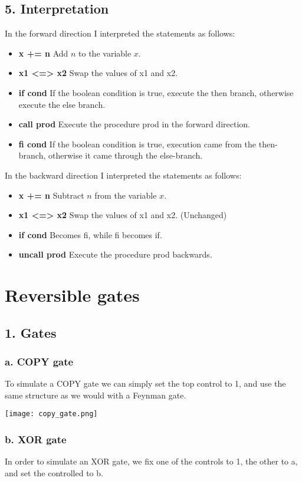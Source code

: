 \documentclass[12pt]{report}
\begin{document}
\subsection*{5. Interpretation}
In the forward direction I interpreted the statements as follows:
\begin{itemize}
\item \textbf{ x += n } Add $n$ to the variable $x$.
\item \textbf{ x1 <=> x2 } Swap the values of x1 and x2.
\item \textbf{ if cond } If the boolean condition is true, execute the then branch, otherwise execute the else branch.
\item \textbf{ call prod } Execute the procedure prod in the forward direction.

\item \textbf{ fi cond } If the boolean condition is true, execution came from the then-branch, otherwise it came through the else-branch.
\end{itemize}

In the backward direction I interpreted the statements as follows:
\begin{itemize}
\item \textbf{ x += n } Subtract $n$ from the variable $x$.
\item \textbf{ x1 <=> x2 } Swap the values of x1 and x2. (Unchanged)
\item \textbf{ if cond } Becomes fi, while fi becomes if.
\item \textbf{ uncall prod } Execute the procedure prod backwards.
\end{itemize}

\section*{Reversible gates}
\subsection*{1. Gates}
  \subsubsection*{a. COPY gate}
    To simulate a COPY gate we can simply set the top control to 1, and use the same structure as we would with a Feynman gate.

    \texttt{[image: copy\_gate.png]}
  \subsubsection*{b. XOR gate}
    In order to simulate an XOR gate, we fix one of the controls to 1, the other to a, and set the controlled to b.
\end{document}
